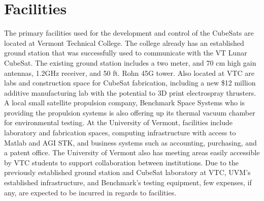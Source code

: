 \section{Facilities}

The primary facilities used for the development and control of the
CubeSats are located at Vermont Technical College.  The college
already has an established ground station that was successfully used
to communicate with the VT Lunar CubeSat.  The existing ground station
includes a two meter, and 70 cm high gain antennas, 1.2GHz receiver,
and 50 ft. Rohn 45G tower.  Also located at VTC are labs and
construction space for CubeSat fabrication, including a new \$12
million additive manufacturing lab with the potential to 3D print
electrospray thrusters.  A local small satellite propulsion company,
Benchmark Space Systems who is providing the propulsion systems is
also offering up its thermal vacuum chamber for environmental testing.
At the University of Vermont, facilities include laboratory and
fabrication spaces, computing infrastructure with access to Matlab and
AGI STK, and business systems such as accounting, purchasing, and a
patent office.  The University of Vermont also has meeting areas
easily accessible by VTC students to support collaboration between
institutions.  Due to the previously established ground station and
CubeSat laboratory at VTC, UVM’s established infrastructure, and
Benchmark’s testing equipment, few expenses, if any, are expected to
be incurred in regards to facilities.
